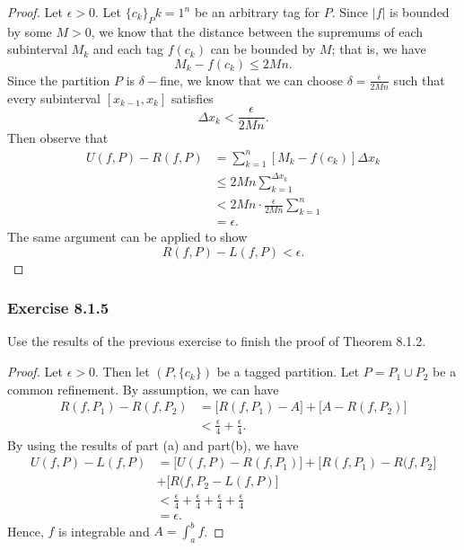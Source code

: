 \begin{enumerate}
        \begin{proof}
            Let \( \epsilon > 0  \). Let \( \{ c_{k } \}_P{k=1}^{n}  \) be an arbitrary tag for \( P  \). Since \( | f |  \) is bounded by some \( M > 0  \), we know that the distance between the supremums of each subinterval \( M_{k} \) and each tag \( f(c_{k }) \) can be bounded by \( M  \); that is, we have 
            \[   M_{k } - f(c_{k }) \leq  2Mn. \] Since the partition \( P  \) is \( \delta- \)fine, we know that we can choose \( \delta = \frac{ \epsilon  }{ 2Mn }  \) such that every subinterval \( [x_{k-1}, x_{k}] \) satisfies 
            \[ \Delta x_{k } < \frac{ \epsilon  }{ 2Mn }. \] Then observe that 
        \begin{align*}
            U(f,P) - R(f,P)   &= \sum_{ k=1 }^{ n } [ M_{k } - f(c_{k })]  \Delta x_{k }\\
                              &\leq 2Mn \sum_{ k=1 }^{ \Delta x_{k } } \\ 
                              &< 2Mn \cdot \frac{ \epsilon  }{ 2Mn } \sum_{ k=1 }^{ n } \\
                              &= \epsilon.
        \end{align*}
        The same argument can be applied to show 
        \[  R(f,P) - L(f,P) < \epsilon. \]
        \end{proof}
\end{enumerate}

\subsubsection{Exercise 8.1.5} Use the results of the previous exercise to finish the proof of Theorem 8.1.2.

\begin{proof}
Let \( \epsilon > 0  \). Then let \( (P, \{ c_{k } \}) \) be a tagged partition. Let \( P = P_{1} \cup P_{2} \) be a common refinement. By assumption, we can have 
\begin{align*}
    R(f,P_{1}) - R(f, P_{2}) &= \big[ R(f, P_{1}) - A  \big] + \big[ A - R(f, P_{2})\big]  \\
                             &< \frac{ \epsilon  }{ 4 }  + \frac{ \epsilon  }{ 4 }.
\end{align*} By using the results of part (a) and part(b), we have 
\begin{align*}
    U(f,P) - L(f,P) &= \big[ U(f,P) - R(f,P_{1}) \big]  + \big[ R(f,P_{1}) - R(f,P_{2} \big] \\ 
                    &+ \big[ R(f,P_{2} - L(f,P) \big]  \\
                    &< \frac{ \epsilon  }{ 4 }  + \frac{ \epsilon  }{ 4 }  + \frac{ \epsilon  }{ 4 }  + \frac{ \epsilon  }{ 4  } \\
                    &= \epsilon.
\end{align*}
Hence, \( f  \) is integrable and \( A = \int_{ a }^{ b } f  \).
\end{proof}

